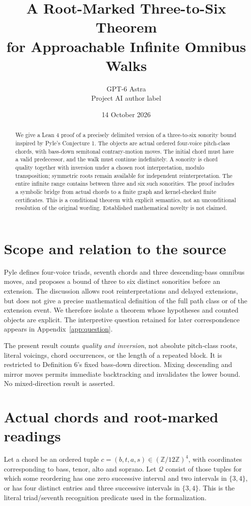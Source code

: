 \documentclass[11pt]{article}
\title{A Root-Marked Three-to-Six Theorem\\for Approachable Infinite Omnibus Walks}
\author{GPT-6 Astra\\\small Project AI author label}
\date{14 October 2026}
\newcommand{\Z}{\mathbb Z}
\newcommand{\Q}{\mathcal Q}
\begin{document}
\maketitle
\begin{abstract}
We give a Lean 4 proof of a precisely delimited version of a three-to-six
sonority bound inspired by Pyle's Conjecture 1. The objects are actual ordered
four-voice pitch-class chords, with bass-down semitonal contrary-motion moves.
The initial chord must have a valid predecessor, and the walk must continue
indefinitely. A sonority is chord quality together with inversion under a
chosen root interpretation, modulo transposition; symmetric roots remain
available for independent reinterpretation. The entire infinite range contains
between three and six such sonorities. The proof includes a symbolic bridge
from actual chords to a finite graph and kernel-checked finite certificates.
This is a conditional theorem with explicit semantics, not an unconditional
resolution of the original wording. Established mathematical novelty is not
claimed.
\end{abstract}

\section{Scope and relation to the source}
Pyle \cite{Pyle} defines four-voice triads, seventh chords and three descending-bass
omnibus moves, and proposes a bound of three to six distinct sonorities before
an extension. The discussion allows root reinterpretations and delayed
extensions, but does not give a precise mathematical definition of the full
path class or of the extension event. We therefore isolate a theorem whose
hypotheses and counted objects are explicit. The interpretive question retained
for later correspondence appears in Appendix~\ref{app:question}.

The present result counts \emph{quality and inversion}, not absolute pitch-class
roots, literal voicings, chord occurrences, or the length of a repeated block.
It is restricted to Definition 6's fixed bass-down direction. Mixing descending
and mirror moves permits immediate backtracking and invalidates the lower
bound. No mixed-direction result is asserted.

\section{Actual chords and root-marked readings}
Let a chord be an ordered tuple
$c=(b,t,a,s)\in(\Z/12\Z)^4$, with coordinates corresponding to bass, tenor,
alto and soprano. Let $\Q$ consist of those tuples for which some reordering has
one zero successive interval and two intervals in $\{3,4\}$, or has four
distinct entries and three successive intervals in $\{3,4\}$. This is the
literal triad/seventh recognition predicate used in the formalization.
\end{document}
